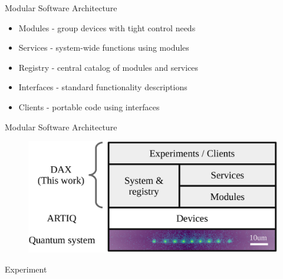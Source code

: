 \documentclass[18 pt]{beamer}
\begin{document}
\begin{frame}{Modular Software Architecture}
\begin{itemize}
\item Modules - group devices with tight control needs
\item Services - system-wide functions using modules
\item Registry - central catalog of modules and services
\item Interfaces - standard functionality descriptions
\item Clients - portable code using interfaces
\end{itemize}
\end{frame}
\begin{frame}{Modular Software Architecture}
  \begin{figure}
    \includegraphics[width=.8\textwidth]{overivew.png}
  \end{figure}
\end{frame}
\begin{frame}{Experiment}
  \begin{figure}
  \end{figure}
\end{frame}
\end{document}
